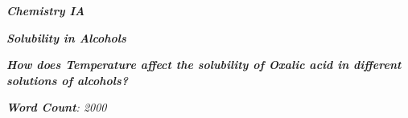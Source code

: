 

\begin{titlepage}
    \begin{center}
        \vspace*{1cm}
            
        \date{}
            
        \huge
            
        \textit{\textbf{Chemistry IA}}
            
        \vspace{0.25cm}
            
        \hline
            
        \vspace{2.5cm}
            
        \textit{\textbf{Solubility in Alcohols}}
            
        \vspace{2.5cm}
            
        \LARGE
            
        \textit{\textbf{How does Temperature affect the solubility of Oxalic acid in different solutions of alcohols? }}
            
        \vspace{2.5cm}
            
        \Large
            
        \vspace{0.25cm}
        

		\vspace{1cm}            
            
		\Large		
		        
		\vspace{0.25cm} 
		
		\textit{\textbf{Word Count}: 2000}		
		   
            
        \vspace{2cm}
            
        \Large
         
		\vspace{0.25cm}         
            
            
        \vspace{0.25cm}
            
        \hline
           
            
    \end{center}
\end{titlepage}



